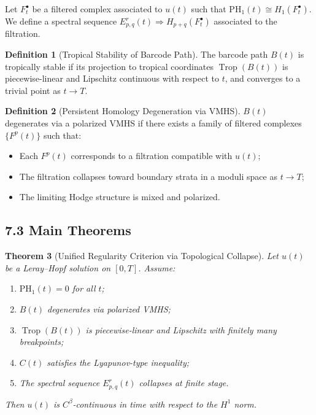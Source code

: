 \documentclass[11pt]{article}
\newtheorem{theorem}{Theorem}[section]
\theoremstyle{definition}
\newtheorem{definition}[theorem]{Definition}
\begin{document}
Let $F^\bullet_t$ be a filtered complex associated to $u(t)$ such that $\mathrm{PH}_1(t) \cong H_1(F^\bullet_t)$. We define a spectral sequence $E^r_{p,q}(t) \Rightarrow H_{p+q}(F^\bullet_t)$ associated to the filtration.

\begin{definition}[Tropical Stability of Barcode Path]
The barcode path $B(t)$ is tropically stable if its projection to tropical coordinates $\operatorname{Trop}(B(t))$ is piecewise-linear and Lipschitz continuous with respect to $t$, and converges to a trivial point as $t \to T$.
\end{definition}

\begin{definition}[Persistent Homology Degeneration via VMHS]
$B(t)$ degenerates via a polarized VMHS if there exists a family of filtered complexes $\{F^p(t)\}$ such that:
\begin{itemize}
  \item Each $F^p(t)$ corresponds to a filtration compatible with $u(t)$;
  \item The filtration collapses toward boundary strata in a moduli space as $t \to T$;
  \item The limiting Hodge structure is mixed and polarized.
\end{itemize}
\end{definition}

\subsection*{7.3 Main Theorems}

\begin{theorem}[Unified Regularity Criterion via Topological Collapse]
Let $u(t)$ be a Leray--Hopf solution on $[0,T]$. Assume:
\begin{enumerate}
  \item $\mathrm{PH}_1(t) = 0$ for all $t$;
  \item $B(t)$ degenerates via polarized VMHS;
  \item $\operatorname{Trop}(B(t))$ is piecewise-linear and Lipschitz with finitely many breakpoints;
  \item $C(t)$ satisfies the Lyapunov-type inequality;
  \item The spectral sequence $E^r_{p,q}(t)$ collapses at finite stage.
\end{enumerate}
Then $u(t)$ is $C^\beta$-continuous in time with respect to the $H^1$ norm.
\end{theorem}
\end{document}
